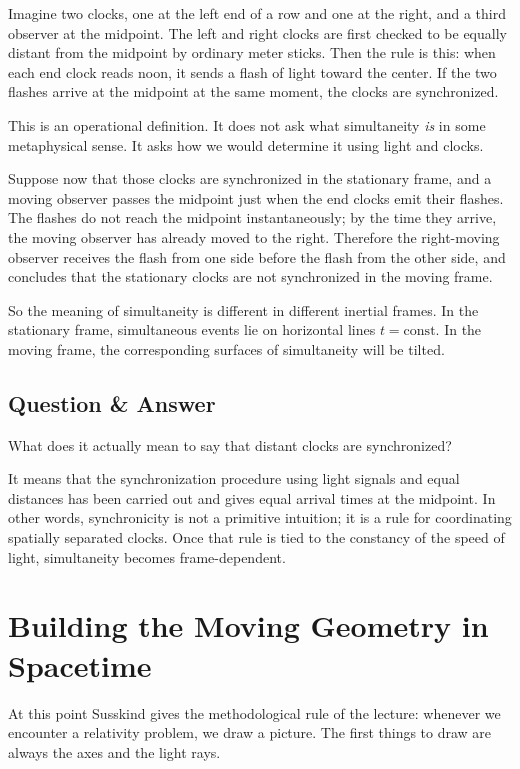 Imagine two clocks, one at the left end of a row and one at the right, and a third observer at the midpoint. The left and right clocks are first checked to be equally distant from the midpoint by ordinary meter sticks. Then the rule is this: when each end clock reads noon, it sends a flash of light toward the center. If the two flashes arrive at the midpoint at the same moment, the clocks are synchronized.

This is an operational definition. It does not ask what simultaneity \emph{is} in some metaphysical sense. It asks how we would determine it using light and clocks.

Suppose now that those clocks are synchronized in the stationary frame, and a moving observer passes the midpoint just when the end clocks emit their flashes. The flashes do not reach the midpoint instantaneously; by the time they arrive, the moving observer has already moved to the right. Therefore the right-moving observer receives the flash from one side before the flash from the other side, and concludes that the stationary clocks are not synchronized in the moving frame.

So the meaning of simultaneity is different in different inertial frames. In the stationary frame, simultaneous events lie on horizontal lines \(t=\text{const}\). In the moving frame, the corresponding surfaces of simultaneity will be tilted.

\subsection{Question \& Answer}

What does it actually mean to say that distant clocks are synchronized?

It means that the synchronization procedure using light signals and equal distances has been carried out and gives equal arrival times at the midpoint. In other words, synchronicity is not a primitive intuition; it is a rule for coordinating spatially separated clocks. Once that rule is tied to the constancy of the speed of light, simultaneity becomes frame-dependent.

\section{Building the Moving Geometry in Spacetime}

At this point Susskind gives the methodological rule of the lecture: whenever we encounter a relativity problem, we draw a picture. The first things to draw are always the axes and the light rays.

